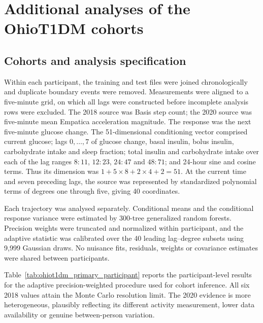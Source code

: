 \documentclass[12pt]{article}
\numberwithin{equation}{section}
\begin{document}
\section{Additional analyses of the OhioT1DM cohorts}
\label{sec:ohiot1dm_supplement}

\subsection{Cohorts and analysis specification}
\label{sec:ohiot1dm_cohort_details}

Within each participant, the training and test files were joined
chronologically and duplicate boundary events were removed. Measurements
were aligned to a five-minute grid, on which all lags were constructed before
incomplete analysis rows were excluded. The 2018 source was Basis step count;
the 2020 source was five-minute mean Empatica acceleration magnitude. The response was the next five-minute glucose change. The 51-dimensional conditioning vector comprised current glucose; lags \(0,\ldots,7\) of glucose change, basal insulin, bolus insulin, carbohydrate intake and sleep fraction; total insulin and carbohydrate intake over each of the lag ranges \(8{:}11\), \(12{:}23\), \(24{:}47\) and \(48{:}71\); and 24-hour sine and cosine terms. Thus its dimension was \(1+5\times8+2\times4+2=51\). At the current time and seven preceding lags, the source was represented by standardized polynomial terms of degrees one through five, giving 40 coordinates.

Each trajectory was analysed separately. Conditional means and the
conditional response variance were estimated by 300-tree generalized random
forests. Precision weights were truncated and normalized within participant,
and the adaptive statistic was calibrated over the 40 leading lag--degree
subsets using 9,999 Gaussian draws. No nuisance fits, residuals, weights or
covariance estimates were shared between participants.



Table~\ref{tab:ohiot1dm_primary_participant} reports the participant-level
results for the adaptive precision-weighted procedure used for cohort
inference. All six 2018 values attain the Monte Carlo resolution limit. The
2020 evidence is more heterogeneous, plausibly reflecting its different
activity measurement, lower data availability or genuine between-person
variation.
\end{document}
